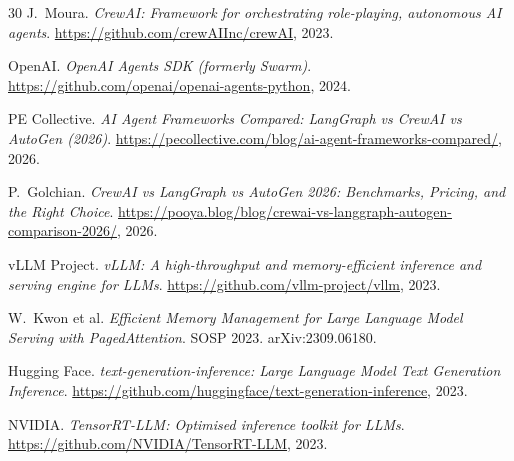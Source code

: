 \begin{thebibliography}{30}
J.~Moura. \textit{CrewAI: Framework for orchestrating role-playing, autonomous AI agents}. \url{https://github.com/crewAIInc/crewAI}, 2023.

OpenAI. \textit{OpenAI Agents SDK (formerly Swarm)}. \url{https://github.com/openai/openai-agents-python}, 2024.

PE Collective. \textit{AI Agent Frameworks Compared: LangGraph vs CrewAI vs AutoGen (2026)}. \url{https://pecollective.com/blog/ai-agent-frameworks-compared/}, 2026.

P.~Golchian. \textit{CrewAI vs LangGraph vs AutoGen 2026: Benchmarks, Pricing, and the Right Choice}. \url{https://pooya.blog/blog/crewai-vs-langgraph-autogen-comparison-2026/}, 2026.

vLLM Project. \textit{vLLM: A high-throughput and memory-efficient inference and serving engine for LLMs}. \url{https://github.com/vllm-project/vllm}, 2023.

W.~Kwon et al. \textit{Efficient Memory Management for Large Language Model Serving with PagedAttention}. SOSP 2023. arXiv:2309.06180.

Hugging Face. \textit{text-generation-inference: Large Language Model Text Generation Inference}. \url{https://github.com/huggingface/text-generation-inference}, 2023.

NVIDIA. \textit{TensorRT-LLM: Optimised inference toolkit for LLMs}. \url{https://github.com/NVIDIA/TensorRT-LLM}, 2023.

\end{thebibliography}

